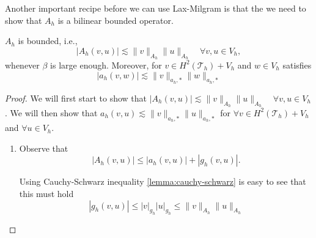 Another important recipe before we can use Lax-Milgram is that the we need to show that $A_{h} $ is a bilinear bounded operator.

\begin{lemma}
    $A_{h}$ is bounded, i.e.,
    $$ \left\lvert A_{h}( v,u) \right\rvert \lesssim \| v \|_{A_{h}  }^{  }     \| u \|_{A_{h}  }^{  } \quad  \forall v,u \in V _{h}, $$
    whenever $\beta $ is large enough. Moreover, for $v \in  H^{2}( \mathcal{T}_{h} ) + V_{h} $
    and $w \in V_{h}$ satisfies \[
    \left\lvert a_{h}( v,w) \right\rvert  \lesssim \| v \|_{ a_{h},* }^{  }  \| w \|_{ a_{h},* }^{  }
    \]
\end{lemma}

\begin{proof}
We will first start to show that $\left\lvert A_{h}( v,u) \right\rvert \lesssim \| v \|_{A_{h}  }^{  }     \| u \|_{A_{h}  }^{  } \quad  \forall v,u \in V_{h} $. We will then show that
$a_{h}( v,u) \lesssim \| v \|_{ a_{h},* }^{  }  \| u \|_{ a_{h},* }^{  }$
for $ \forall v \in  H^{2}( \mathcal{T}_{h} ) + V_{h} $ and $ \forall u \in V_{h}$.

    \begin{enumerate}[label=\arabic*)]
        \item  Observe that \[
    \left\lvert A_{h}( v,u) \right\rvert \le  \left\lvert a_{h}( v,u)  \right\rvert  + \left\lvert g_{h}( v,u)  \right\rvert.
    \]

         Using Cauchy-Schwarz inequality \ref{lemma:cauchy-schwarz} is easy to see that this must hold \[
\left\lvert g_{h}( v,u)  \right\rvert \le \left\lvert v \right\rvert _{g_{h}} \left\lvert u \right\rvert _{g_{h}} \le \| v \|_{ A_{h} }^{  } \| u \|_{ A_{h} }^{  }
    \]


\end{enumerate}
\end{proof}
